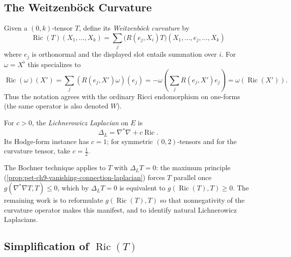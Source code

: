 \subsection{The Weitzenböck Curvature}

\begin{definition}
  \label{def:pet-ch9-weitzenbock-curvature-operator}

  Given a $(0,k)$-tensor $T$, define its \emph{Weitzenb\"ock curvature} by
  \[
    \operatorname{Ric}(T)(X_1,\dots,X_k)=\sum_j\big(R(e_j,X_i)T\big)(X_1,\dots,e_j,\dots,X_k)
  \]
  where $e_j$ is orthonormal and the displayed slot entails summation over
  $i$.  For $\omega=X^\flat$ this specializes to
  \[
    \operatorname{Ric}(\omega)(X')
      =\sum_j(R(e_j,X')\omega)(e_j)
      =-\omega\left(\sum_jR(e_j,X')e_j\right)
      =\omega(\operatorname{Ric}(X')).
  \]
  Thus the notation agrees with the ordinary Ricci endomorphism on one-forms
  (the same operator is also denoted $W$).
\end{definition}

\begin{definition}
  \label{def:pet-ch9-lichnerowicz-laplacian}

  For $c>0$, the \emph{Lichnerowicz Laplacian} on $E$ is
  \[
    \Delta_L=\nabla^*\nabla+c\operatorname{Ric}.
  \]
  Its Hodge-form instance has $c=1$; for symmetric $(0,2)$-tensors and for
  the curvature tensor, take $c=\tfrac12$.
\end{definition}

The Bochner technique applies to $T$ with $\Delta_LT=0$: the maximum principle
(\cref{prop:pet-ch9-vanishing-connection-laplacian}) forces $T$ parallel once
$g(\nabla^*\nabla T,T)\le0$, which by $\Delta_LT=0$ is equivalent to
$g(\operatorname{Ric}(T),T)\ge0$. The remaining work is to reformulate
$g(\operatorname{Ric}(T),T)$ so that nonnegativity of the curvature operator makes this
manifest, and to identify natural Lichnerowicz Laplacians.

\subsection{Simplification of $\operatorname{Ric}(T)$}

